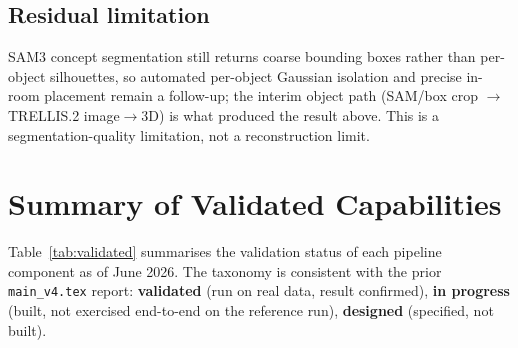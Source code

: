\subsection{Residual limitation}

SAM3 concept segmentation still returns coarse bounding boxes rather than per-object
silhouettes, so automated per-object Gaussian isolation and precise in-room placement
remain a follow-up; the interim object path (SAM/box crop $\rightarrow$ TRELLIS.2
image$\rightarrow$3D) is what produced the result above. This is a segmentation-quality
limitation, not a reconstruction limit.

\section{Summary of Validated Capabilities}
\label{sec:results:summary}

Table~\ref{tab:validated} summarises the validation status of each pipeline component as
of June 2026.  The taxonomy is consistent with the prior \texttt{main\_v4.tex} report:
\textbf{validated} (run on real data, result confirmed), \textbf{in progress} (built,
not exercised end-to-end on the reference run), \textbf{designed} (specified, not built).

